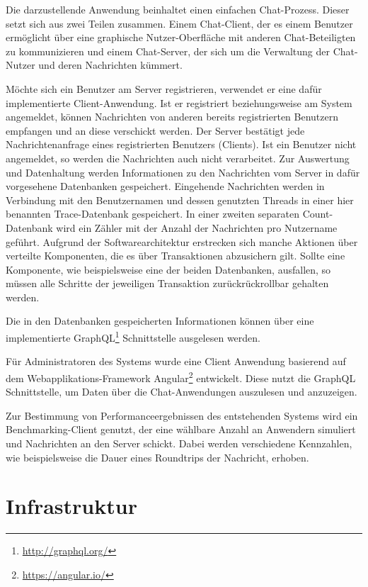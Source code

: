 \documentclass[10pt,journal,compsoc]{IEEEtran}
\begin{document}
Die darzustellende Anwendung beinhaltet einen einfachen Chat-Prozess. Dieser setzt sich aus zwei Teilen zusammen. Einem Chat-Client, der es einem Benutzer ermöglicht über eine graphische Nutzer-Oberfläche mit anderen Chat-Beteiligten zu kommunizieren und einem Chat-Server, der sich um die Verwaltung der Chat-Nutzer und deren Nachrichten kümmert. 

Möchte sich ein Benutzer am Server registrieren, verwendet er eine dafür implementierte Client-Anwendung. Ist er registriert beziehungsweise am System angemeldet, können Nachrichten von anderen bereits registrierten Benutzern empfangen und an diese verschickt werden. Der Server bestätigt jede Nachrichtenanfrage eines registrierten Benutzers (Clients). Ist ein Benutzer nicht angemeldet, so werden die Nachrichten auch nicht verarbeitet. Zur Auswertung und Datenhaltung werden Informationen zu den Nachrichten vom Server in dafür vorgesehene Datenbanken gespeichert. Eingehende Nachrichten werden in Verbindung mit den Benutzernamen und dessen genutzten Threads in einer hier benannten Trace-Datenbank gespeichert. In einer zweiten separaten Count-Datenbank wird ein Zähler mit der Anzahl der Nachrichten pro Nutzername geführt. Aufgrund der Softwarearchitektur erstrecken sich manche Aktionen über verteilte Komponenten, die es über Transaktionen abzusichern gilt. Sollte eine Komponente, wie beispielsweise eine der beiden Datenbanken, ausfallen, so müssen alle Schritte der jeweiligen Transaktion zurückrückrollbar gehalten werden.

Die in den Datenbanken gespeicherten Informationen können über eine implementierte GraphQL\footnote{\url{http://graphql.org/}} Schnittstelle ausgelesen werden.

Für Administratoren des Systems wurde eine Client Anwendung basierend auf dem Webapplikations-Framework Angular\footnote{\url{https://angular.io/}} entwickelt. Diese nutzt die GraphQL Schnittstelle, um Daten über die Chat-Anwendungen auszulesen und anzuzeigen.

Zur Bestimmung von Performanceergebnissen des entstehenden Systems wird ein Benchmarking-Client genutzt, der eine wählbare Anzahl an Anwendern simuliert und Nachrichten an den Server schickt. Dabei werden verschiedene Kennzahlen, wie beispielsweise die Dauer eines Roundtrips der Nachricht, erhoben.

\section{Infrastruktur}
\end{document}
